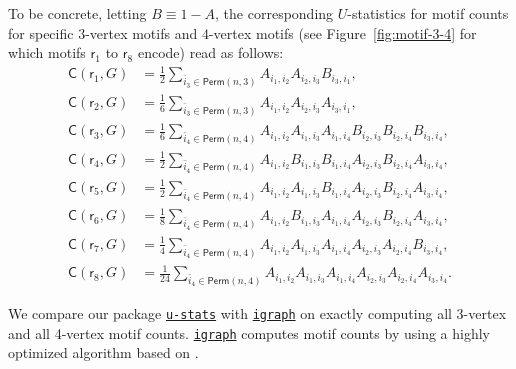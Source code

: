 \documentclass[letterpaper,11pt]{article}
\newcommand{\libref}[2]{\href{#2}{\texttt{#1}}}
\def\sfr{\mathsf{r}}
\newcommand{\perm}[1]{\mathsf{Perm}(#1)}
\newcommand{\completegraphp}[1]{K_{#1}}
\newcommand{\motifrg}[2]{\mathsf{C}(#1,#2)}
\newcommand{\less}{O}
\def\package{\libref{u-stats}{https://github.com/zrq1706/U-Statistics-Python}}
\def\igraph{\libref{igraph}{https://igraph.org/}}
\begin{document}
\begin{bibunit}[plainnat]
To be concrete, letting $B \equiv 1 - A$, the corresponding $U$-statistics for motif counts for specific $3$-vertex motifs and $4$-vertex motifs (see Figure~\ref{fig:motif-3-4} for which motifs $\sfr_1$ to $\sfr_8$ encode) read as follows:
\begin{align*}
\motifrg{\sfr_1}{G} & = \frac{1}{2} \sum_{ \bar{i}_{3} \in \perm{n,3}}  A_{i_1, i_2} A_{i_2, i_3}  B_{i_3, i_1}, \\ \motifrg{\sfr_2}{G} & = \frac{1}{6} \sum_{ \bar{i}_{3} \in \perm{n,3}}  A_{i_1, i_2} A_{i_2, i_3} A_{i_3, i_1}, \\
\motifrg{\sfr_3}{G} & = \frac{1}{6} \sum_{ \bar{i}_{4} \in \perm{n,4}}  A_{i_1, i_2} A_{i_1, i_3} A_{i_1, i_4} B_{i_2, i_3} B_{i_2, i_4} B_{i_3, i_4}, \\ 
\motifrg{\sfr_4}{G} & = \frac{1}{2} \sum_{ \bar{i}_{4} \in \perm{n,4}}  A_{i_1, i_2} B_{i_1, i_3} B_{i_1, i_4} A_{i_2, i_3} B_{i_2, i_4} A_{i_3, i_4}, \\ 
\motifrg{\sfr_5}{G} & = \frac{1}{2} \sum_{ \bar{i}_{4} \in \perm{n,4}}  A_{i_1, i_2} A_{i_1, i_3} B_{i_1, i_4} A_{i_2, i_3} B_{i_2, i_4} A_{i_3, i_4}, \\ 
\motifrg{\sfr_6}{G} & = \frac{1}{8} \sum_{ \bar{i}_{4} \in \perm{n,4}}  A_{i_1, i_2} B_{i_1, i_3} A_{i_1, i_4} A_{i_2, i_3} B_{i_2, i_4} A_{i_3, i_4}, \\ 
\motifrg{\sfr_7}{G} & = \frac{1}{4} \sum_{ \bar{i}_{4} \in \perm{n,4}}  A_{i_1, i_2} A_{i_1, i_3} A_{i_1, i_4} A_{i_2, i_3} A_{i_2, i_4} B_{i_3, i_4}, \\ 
\motifrg{\sfr_8}{G} & = \frac{1}{24} \sum_{ \bar{i}_{4} \in \perm{n,4}}  A_{i_1, i_2} A_{i_1, i_3} A_{i_1, i_4} A_{i_2, i_3} A_{i_2, i_4} A_{i_3, i_4}.
\end{align*}


We compare our package \package{} with \igraph{} \citep{csardi2006igraph} on exactly computing all 3-vertex and all 4-vertex motif counts. \igraph{} computes motif counts by using a highly optimized algorithm based on \citet{wernicke2006fanmod}. 


\end{bibunit}
\end{document}
